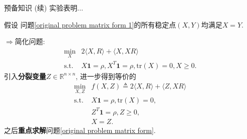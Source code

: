 \documentclass{beamer}
\newcommand{\trace}{\mathrm{tr}}
\newcommand{\st}{\mathrm{s.t.}}
\newcommand{\one}{\mathbf{1}}
\begin{document}
\begin{frame}{预备知识 (续)}
实验表明$\ldots$
\begin{block}{假设}
问题\eqref{original problem matrix form 1}的所有稳定点$(X,Y)$均满足$X=Y$.
\end{block}\pause
$\Rightarrow$简化问题:
\begin{equation}
	\begin{array}{rl}
		\min\limits_X & 2\langle X,R\rangle+\langle X,XR\rangle\\
		\st & X\one=\rho,X^T\one=\rho,\trace(X)=0,X\ge0.
	\end{array}
	\label{original problem matrix form 2}
\end{equation}\pause
引入\textbf{分裂变量}$Z\in\mathbb{R}^{n\times n}$, 进一步得到等价的
\begin{equation}
	\begin{array}{rl}
		\min\limits_{X,Z} & f(X,Z)\triangleq2\langle X,R\rangle+\langle Z,XR\rangle\\
		\st & X\one=\rho,\trace(X)=0,\\
		 & Z^T\one=\rho,Z\ge0,\\
		 & X=Z.
	\end{array}
	\label{original problem matrix form}
\end{equation}
之后\textbf{重点求解}问题\eqref{original problem matrix form}.
\end{frame}
\end{document}
